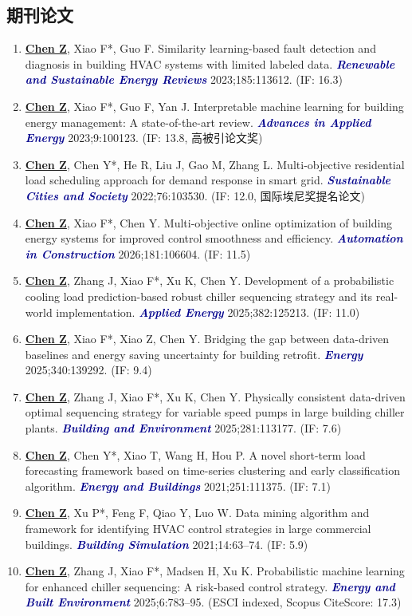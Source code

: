 \documentclass[11pt,a4paper]{article}
\newcounter{cvbookmark}
\newcommand{\cvoutline}[2]{%
  \stepcounter{cvbookmark}%
  \pdfbookmark[#1]{#2}{cvbookmark.\thecvbookmark}%
}
\newcommand{\cvsubsection}[2]{%
  \cvoutline{2}{#1}%
  \subsection*{#2}%
}
\newcommand{\me}[1]{\underline{\textbf{#1}}}
\newcommand{\journal}[1]{\textcolor{darkblue}{\textbf{\textit{#1}}}}
\begin{document}
\cvsubsection{期刊论文}{\color{darkblue}期刊论文}
\begin{enumerate}
\item \me{Chen Z}, Xiao F*, Guo F. Similarity learning-based fault detection and diagnosis in building HVAC systems with limited labeled data. \journal{Renewable and Sustainable Energy Reviews} 2023;185:113612. (IF: 16.3)
\item \me{Chen Z}, Xiao F*, Guo F, Yan J. Interpretable machine learning for building energy management: A state-of-the-art review. \journal{Advances in Applied Energy} 2023;9:100123. (IF: 13.8, 高被引论文奖)
\item \me{Chen Z}, Chen Y*, He R, Liu J, Gao M, Zhang L. Multi-objective residential load scheduling approach for demand response in smart grid. \journal{Sustainable Cities and Society} 2022;76:103530. (IF: 12.0, 国际埃尼奖提名论文)
\item \me{Chen Z}, Xiao F*, Chen Y. Multi-objective online optimization of building energy systems for improved control smoothness and efficiency. \journal{Automation in Construction} 2026;181:106604. (IF: 11.5)
\item \me{Chen Z}, Zhang J, Xiao F*, Xu K, Chen Y. Development of a probabilistic cooling load prediction-based robust chiller sequencing strategy and its real-world implementation. \journal{Applied Energy} 2025;382:125213. (IF: 11.0)
\item \me{Chen Z}, Xiao F*, Xiao Z, Chen Y. Bridging the gap between data-driven baselines and energy saving uncertainty for building retrofit. \journal{Energy} 2025;340:139292. (IF: 9.4)
\item \me{Chen Z}, Zhang J, Xiao F*, Xu K, Chen Y. Physically consistent data-driven optimal sequencing strategy for variable speed pumps in large building chiller plants. \journal{Building and Environment} 2025;281:113177. (IF: 7.6)
\item \me{Chen Z}, Chen Y*, Xiao T, Wang H, Hou P. A novel short-term load forecasting framework based on time-series clustering and early classification algorithm. \journal{Energy and Buildings} 2021;251:111375. (IF: 7.1)
\item \me{Chen Z}, Xu P*, Feng F, Qiao Y, Luo W. Data mining algorithm and framework for identifying HVAC control strategies in large commercial buildings. \journal{Building Simulation} 2021;14:63--74. (IF: 5.9)
\item \me{Chen Z}, Zhang J, Xiao F*, Madsen H, Xu K. Probabilistic machine learning for enhanced chiller sequencing: A risk-based control strategy. \journal{Energy and Built Environment} 2025;6:783--95. (ESCI indexed, Scopus CiteScore: 17.3)

\end{enumerate}
\end{document}
